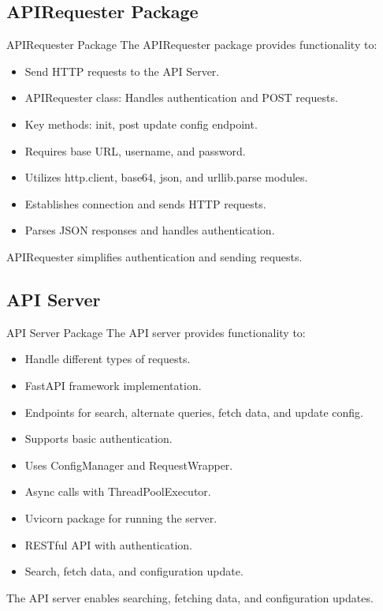 \documentclass{beamer}
\begin{document}
\subsection{APIRequester Package}

\begin{frame}{APIRequester Package}
    The APIRequester package provides functionality to:
    \begin{itemize}
    \item Send HTTP requests to the API Server.
    \item APIRequester class: Handles authentication and POST requests.
    \item Key methods: init, post update config endpoint.
    \item Requires base URL, username, and password.
    \item Utilizes http.client, base64, json, and urllib.parse modules.
    \item Establishes connection and sends HTTP requests.
    \item Parses JSON responses and handles authentication.
    \end{itemize}
    APIRequester simplifies authentication and sending requests.
\end{frame}
    

\subsection{API Server}
\begin{frame}{API Server Package}
    The API server provides functionality to:
    \begin{itemize}
    \item Handle different types of requests.
    \item FastAPI framework implementation.
    \item Endpoints for search, alternate queries, fetch data, and update config.
    \item Supports basic authentication.
    \item Uses ConfigManager and RequestWrapper.
    \item Async calls with ThreadPoolExecutor.
    \item Uvicorn package for running the server.
    \item RESTful API with authentication.
    \item Search, fetch data, and configuration update.
    \end{itemize}
    The API server enables searching, fetching data, and configuration updates.
    \end{frame}
    
\end{document}

